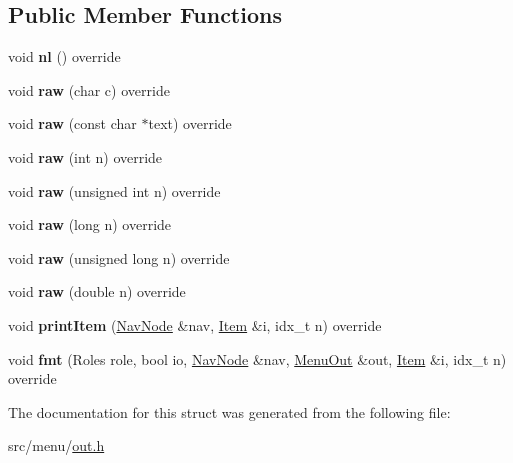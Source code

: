 \subsection*{Public Member Functions}
\begin{DoxyCompactItemize}
\item 
\mbox{\label{structMenuOutDef_a3bdf78cf3e8d7d1cfa5ac7259ca7621e}} 
void {\bfseries nl} () override
\item 
\mbox{\label{structMenuOutDef_a39e40e2057b5826cfb7e7335e34a8ab7}} 
void {\bfseries raw} (char c) override
\item 
\mbox{\label{structMenuOutDef_aa152cf800b2e15afc5ce302578b25e50}} 
void {\bfseries raw} (const char $\ast$text) override
\item 
\mbox{\label{structMenuOutDef_a036d30bc8f65edfd150439f3ecb39494}} 
void {\bfseries raw} (int n) override
\item 
\mbox{\label{structMenuOutDef_a6940e8010dff0dc9b0aee9e899e96168}} 
void {\bfseries raw} (unsigned int n) override
\item 
\mbox{\label{structMenuOutDef_ad11ac90acb590394dc7adaa96a83ecc0}} 
void {\bfseries raw} (long n) override
\item 
\mbox{\label{structMenuOutDef_a956cfa61db20321a27339db830e89001}} 
void {\bfseries raw} (unsigned long n) override
\item 
\mbox{\label{structMenuOutDef_a29bfe7f19880b633c76bf75cb43ef786}} 
void {\bfseries raw} (double n) override
\item 
\mbox{\label{structMenuOutDef_a9f373df24ad0f16625dd1ba97b422491}} 
void {\bfseries print\+Item} (\hyperlink{structNavNode}{Nav\+Node} \&nav, \hyperlink{structItem}{Item} \&i, idx\+\_\+t n) override
\item 
\mbox{\label{structMenuOutDef_afea6ae776b595da4c6b0f17b19807a94}} 
void {\bfseries fmt} (Roles role, bool io, \hyperlink{structNavNode}{Nav\+Node} \&nav, \hyperlink{structMenuOut}{Menu\+Out} \&out, \hyperlink{structItem}{Item} \&i, idx\+\_\+t n) override
\end{DoxyCompactItemize}


The documentation for this struct was generated from the following file\+:\begin{DoxyCompactItemize}
\item 
src/menu/\hyperlink{out_8h}{out.\+h}\end{DoxyCompactItemize}
